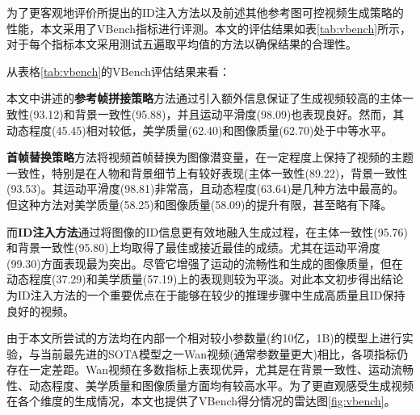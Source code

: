 为了更客观地评价所提出的ID注入方法以及前述其他参考图可控视频生成策略的性能，本文采用了VBench\cite{huang2023vbench,huang2024vbench++,zheng2025vbench2}指标进行评测。本文的评估结果如表\ref{tab:vbench}所示，对于每个指标本文采用测试五遍取平均值的方法以确保结果的合理性。
\begin{table*}[t]
\centering
\caption{不同方法在VBench各项指标上的表现对比}
\scriptsize
\setlength{\tabcolsep}{2pt}
\renewcommand{\arraystretch}{1.0}
\vspace{-0.1in}
\label{tab:vbench}
\end{table*}


从表格\ref{tab:vbench}的VBench评估结果来看：

本文中讲述的\textbf{参考帧拼接策略}方法通过引入额外信息保证了生成视频较高的主体一致性(93.12)和背景一致性(95.88)，并且运动平滑度(98.09)也表现良好。然而，其动态程度(45.45)相对较低，美学质量(62.40)和图像质量(62.70)处于中等水平。

\textbf{首帧替换策略}方法将视频首帧替换为图像潜变量，在一定程度上保持了视频的主题一致性，特别是在人物和背景细节上有较好表现(主体一致性(89.22)，背景一致性(93.53)。其运动平滑度(98.81)非常高，且动态程度(63.64)是几种方法中最高的。但这种方法对美学质量(58.25)和图像质量(58.09)的提升有限，甚至略有下降。

而\textbf{ID注入方法}通过将图像的ID信息更有效地融入生成过程，在主体一致性(95.76)和背景一致性(95.80)上均取得了最佳或接近最佳的成绩。尤其在运动平滑度(99.30)方面表现最为突出。尽管它增强了运动的流畅性和生成的图像质量，但在动态程度(37.29)和美学质量(57.19)上的表现则较为平淡。对此本文初步得出结论为ID注入方法的一个重要优点在于能够在较少的推理步骤中生成高质量且ID保持良好的视频。

由于本文所尝试的方法均在内部一个相对较小参数量(约10亿，1B)的模型上进行实验，与当前最先进的SOTA模型之一Wan视频\cite{wan2025}(通常参数量更大)相比，各项指标仍存在一定差距。Wan视频在多数指标上表现优异，尤其是在背景一致性、运动流畅性、动态程度、美学质量和图像质量方面均有较高水平。为了更直观感受生成视频在各个维度的生成情况，本文也提供了VBench得分情况的雷达图\ref{fig:vbench}。

